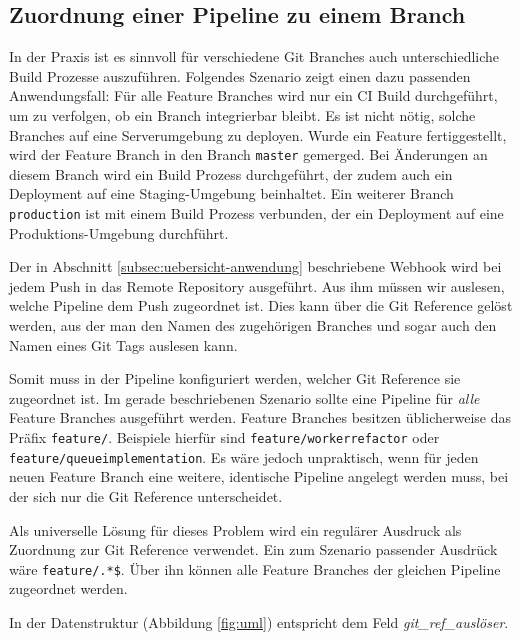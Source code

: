 \subsection{Zuordnung einer Pipeline zu einem Branch}

In der Praxis ist es sinnvoll für verschiedene Git Branches auch unterschiedliche Build Prozesse auszuführen. Folgendes Szenario zeigt einen dazu passenden Anwendungsfall: Für alle Feature Branches wird nur ein \ac{CI} Build durchgeführt, um zu verfolgen, ob ein Branch integrierbar bleibt. Es ist nicht nötig, solche Branches auf eine Serverumgebung zu deployen. Wurde ein Feature fertiggestellt, wird der Feature Branch in den Branch \texttt{master} gemerged. Bei Änderungen an diesem Branch wird ein Build Prozess durchgeführt, der zudem auch ein Deployment auf eine Staging-Umgebung beinhaltet. Ein weiterer Branch \texttt{production} ist mit einem Build Prozess verbunden, der ein Deployment auf eine Produktions-Umgebung durchführt.

Der in Abschnitt \ref{subsec:uebersicht-anwendung} beschriebene Webhook wird bei jedem Push in das Remote Repository ausgeführt. Aus ihm müssen wir auslesen, welche Pipeline dem Push zugeordnet ist. Dies kann über die Git Reference gelöst werden, aus der man den Namen des zugehörigen Branches und sogar auch den Namen eines Git Tags auslesen kann.

Somit muss in der Pipeline konfiguriert werden, welcher Git Reference sie zugeordnet ist. Im gerade beschriebenen Szenario sollte eine Pipeline für \emph{alle} Feature Branches ausgeführt werden. Feature Branches besitzen üblicherweise das Präfix \texttt{feature/}. Beispiele hierfür sind \texttt{feature/worker\-refactor} oder \texttt{feature/queue\-implementation}. Es wäre jedoch unpraktisch, wenn für jeden neuen Feature Branch eine weitere, identische Pipeline angelegt werden muss, bei der sich nur die Git Reference unterscheidet.

Als universelle Lösung für dieses Problem wird ein regulärer Ausdruck als Zuordnung zur Git Reference verwendet. Ein zum Szenario passender Ausdrück wäre \texttt{feature/.*\$}. Über ihn können alle Feature Branches der gleichen Pipeline zugeordnet werden.

In der Datenstruktur (Abbildung \ref{fig:uml}) entspricht dem Feld \emph{git\_ref\_auslöser}.
